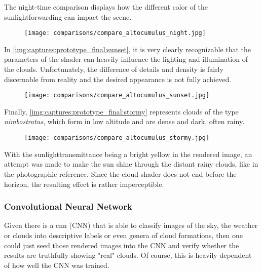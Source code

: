 \noindent
The night-time comparison displays how the different color of the \gls{sunlightforwarding} can impact the scene.

\begin{figure}[H]
    \centering
    \texttt{[image: comparisons/compare\_altocumulus\_night.jpg]}
    \label{img:comparisons:altocumulus:night}
\end{figure}

\clearpage
\noindent
In \autoref{img:captures:prototype_final:sunset}, it is very clearly recognizable that the \gls{parameters} of the shader can heavily influence the lighting and illumination of the clouds.
Unfortunately, the difference of details and density is fairly discernable from reality and the desired appearance is not fully achieved.

\begin{figure}[H]
    \centering
    \texttt{[image: comparisons/compare\_altocumulus\_sunset.jpg]}
    \label{img:camparisons:altocumulus:sunset}
\end{figure}

\noindent
Finally, \autoref{img:captures:prototype_final:stormy} represents clouds of the type \textit{nimbostratus}, which form in low altitude and are dense and dark, often rainy.


\begin{figure}[H]
    \centering
    \texttt{[image: comparisons/compare\_altocumulus\_stormy.jpg]}
    \label{img:camparisons:altocumulus:stormy}
\end{figure}

\noindent
With the \gls{sunlighttransmittance} being a bright yellow in the rendered image, an attempt was made to make the sun shine through the distant rainy clouds, like in the photographic reference. Since the cloud shader does not end before the horizon, the resulting effect is rather imperceptible.

\clearpage
\subsubsection{Convolutional Neural Network}
Given there is a \gls{cnn} (CNN) that is able to classify images of the sky, the weather or clouds into descriptive labels or even genera of cloud formations, then one could just seed those rendered images into the CNN and verify whether the results are truthfully showing "real" clouds.
Of course, this is heavily dependent of how well the CNN was trained.

